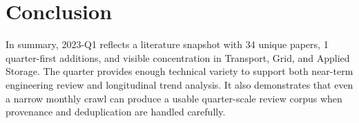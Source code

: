 \documentclass[conference]{IEEEtran}
\begin{document}
\section{Conclusion}
In summary, 2023-Q1 reflects a literature snapshot with 34 unique papers, 1 quarter-first additions, and visible concentration in Transport, Grid, and Applied Storage. The quarter provides enough technical variety to support both near-term engineering review and longitudinal trend analysis. It also demonstrates that even a narrow monthly crawl can produce a usable quarter-scale review corpus when provenance and deduplication are handled carefully.



\end{document}
